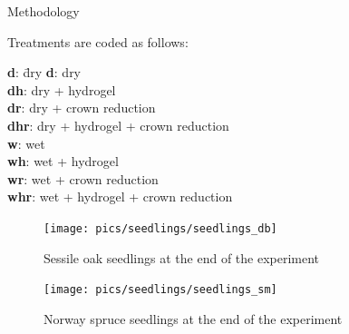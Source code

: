 \documentclass[final]{beamer}
\newlength{\sepwidth}
\newlength{\colwidth}
\newcommand{\separatorcolumn}{\begin{column}{\sepwidth}\end{column}}
\begin{document}
\begin{frame}[t]
\begin{columns}[t]
\begin{column}{\colwidth}
\begin{block}{Methodology}
\begin{minipage}[t]{0.45\textwidth}
        Treatments are coded as follows:
        \begin{tabbing}
            \textbf{d}: \quad\= dry \kill
            \textbf{d}: \> dry \\
            \textbf{dh}: \> dry + hydrogel \\
            \textbf{dr}: \> dry + crown reduction\\
            \textbf{dhr}: \> dry + hydrogel + crown reduction \\
            \textbf{w}: \> wet \\
            \textbf{wh}: \> wet + hydrogel \\
            \textbf{wr}: \> wet + crown reduction\\
            \textbf{whr}: \> wet + hydrogel + crown reduction
        \end{tabbing}
    \end{minipage}\hfill

    \begin{figure}
        \begin{minipage}{0.45\textwidth}
            \centering \texttt{[image: pics/seedlings/seedlings\_db]}
            \caption{Sessile oak seedlings at the end of the experiment}
            \label{fig:sm}
        \end{minipage}\hfill
        \begin{minipage}{0.45\textwidth}
            \centering \texttt{[image: pics/seedlings/seedlings\_sm]}
            \caption{Norway spruce seedlings at the end of the experiment}
            \label{fig:db}
        \end{minipage}\hfill
    \end{figure}

\end{block}

\end{column}


\begin{column}{\colwidth}


\end{column}
\end{columns}
\end{frame}
\end{document}

